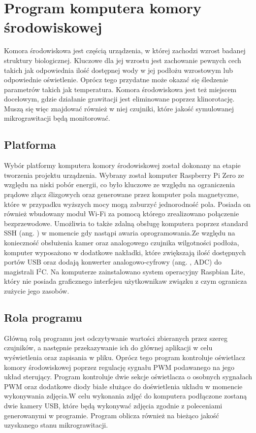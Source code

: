 \graphicspath{{./Komora/images/}}

\chapter{Program komputera komory środowiskowej}

Komora środowiskowa jest częścią urządzenia, w której zachodzi wzrost badanej struktury biologicznej. Kluczowe dla jej wzrostu jest zachowanie pewnych cech takich jak odpowiednia ilość dostępnej wody w jej podłożu wzrostowym lub odpowiednie oświetlenie. Oprócz tego przydatne może okazać się śledzenie parametrów takich jak temperatura. Komora środowiskowa jest też miejscem docelowym, gdzie działanie grawitacji jest eliminowane poprzez klinorotację. Muszą się więc znajdować również w niej czujniki, które jakość symulowanej mikrograwitacji będą monitorować.

\section{Platforma}

Wybór platformy komputera komory środowiskowej został dokonany na etapie tworzenia projektu urządzenia. Wybrany został komputer Raspberry Pi Zero ze względu na niski pobór energii, co było kluczowe ze względu na ograniczenia prądowe złącz ślizgowych oraz generowane przez komputer pola magnetyczne, które w przypadku wyższych mocy mogą zaburzyć jednorodność pola. Posiada on również wbudowany moduł Wi-Fi za pomocą którego zrealizowano połączenie bezprzewodowe. Umożliwia to także zdalną obsługę komputera poprzez standard SSH (ang. ) w momencie gdy nastąpi awaria oprogramowania.\linebreak Ze względu na konieczność obsłużenia kamer oraz analogowego czujnika wilgotności podłoża, komputer wyposażono w dodatkowe nakładki, które zwiększają ilość dostępnych portów USB oraz dodają konwerter analogowo-cyfrowy (ang. , ADC) do magistrali I$^2$C. Na komputerze zainstalowano system operacyjny Raspbian Lite, który nie posiada graficznego interfejsu użytkownika\linebreak w związku z czym ogranicza zużycie jego zasobów.

\section{Rola programu}

Główną rolą programu jest odczytywanie wartości zbieranych przez szereg czujników, a następnie przekazywanie ich do głównej aplikacji w celu wyświetlenia oraz zapisania w pliku. Oprócz tego program kontroluje oświetlacz komory środowiskowej poprzez regulację sygnału PWM podawanego na jego układ sterujący. Program kontroluje dwie sekcje oświetlacza o osobnych sygnałach PWM oraz dodatkowe diody białe służące do doświetlenia układu w momencie wykonywania zdjęcia.\linebreak W celu wykonania zdjęć do komputera podłączone zostaną dwie kamery USB, które będą wykonywać zdjęcia zgodnie z poleceniami generowanymi w programie. Program oblicza również na bieżąco jakość uzyskanego stanu mikrograwitacji.

